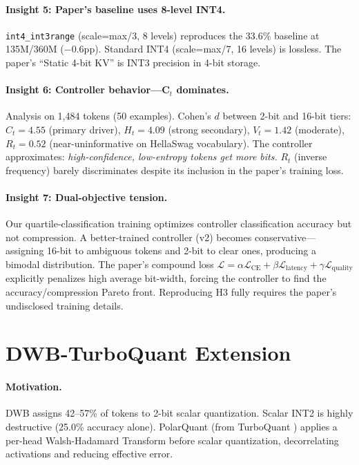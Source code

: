 \documentclass[10pt,twocolumn]{article}
\begin{document}
\paragraph{Insight 5: Paper's baseline uses 8-level INT4.}
\texttt{int4\_int3range} (scale=max/3, 8 levels) reproduces the 33.6\%
baseline at 135M/360M ($-$0.6pp).
Standard INT4 (scale=max/7, 16 levels) is lossless.
The paper's ``Static 4-bit KV'' is INT3 precision in 4-bit storage.

\paragraph{Insight 6: Controller behavior—C$_t$ dominates.}
Analysis on 1,484 tokens (50 examples).
Cohen's $d$ between 2-bit and 16-bit tiers:
$C_t = 4.55$ (primary driver),
$H_t = 4.09$ (strong secondary),
$V_t = 1.42$ (moderate),
$R_t = 0.52$ (near-uninformative on HellaSwag vocabulary).
The controller approximates: \emph{high-confidence, low-entropy tokens
get more bits.}
$R_t$ (inverse frequency) barely discriminates despite its inclusion in
the paper's training loss.

\paragraph{Insight 7: Dual-objective tension.}
Our quartile-classification training optimizes controller classification
accuracy but not compression.
A better-trained controller (v2) becomes conservative—assigning 16-bit
to ambiguous tokens and 2-bit to clear ones, producing a bimodal
distribution.
The paper's compound loss $\mathcal{L} = \alpha\mathcal{L}_\text{CE} +
\beta\mathcal{L}_\text{latency} + \gamma\mathcal{L}_\text{quality}$
explicitly penalizes high average bit-width, forcing the controller to
find the accuracy/compression Pareto front.
Reproducing H3 fully requires the paper's undisclosed training details.

\section{DWB-TurboQuant Extension}
\label{sec:turboquant}

\paragraph{Motivation.}
DWB assigns 42--57\% of tokens to 2-bit scalar quantization.
Scalar INT2 is highly destructive (25.0\% accuracy alone).
PolarQuant (from TurboQuant \cite{turboQuant2026}) applies a per-head
Walsh-Hadamard Transform before scalar quantization, decorrelating
activations and reducing effective error.
\end{document}
